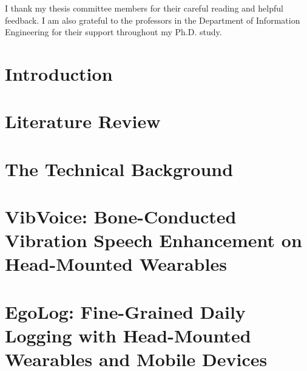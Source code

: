 \documentclass[11pt]{gsasthesis} %
\begin{document}
\tableofcontents %

\listoftables
\listoffigures
\begin{acknowledgments}  
  I thank my thesis committee members for their careful reading and helpful feedback. I am also grateful to the professors in the Department of Information Engineering for their support throughout my Ph.D. study.  
\end{acknowledgments}



\chapter{Introduction}\label{ch:intro}


\chapter{Literature Review}\label{ch:related}


\chapter{The Technical Background}\label{ch:background}


\chapter{VibVoice: Bone-Conducted Vibration Speech Enhancement on Head-Mounted Wearables}\label{ch:vibvoice}


\chapter{EgoLog: Fine-Grained Daily Logging with Head-Mounted Wearables and Mobile Devices}\label{ch:egolog}

\end{document}
